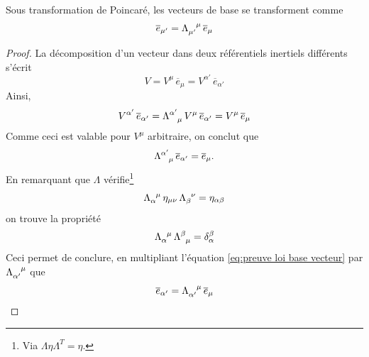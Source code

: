{\begin{notat}
\end{notat}
\begin{theoremframe}
    \begin{propri}
        Sous transformation de Poincaré, les vecteurs de base se transforment comme
        \begin{equation}
            \overline{e}_{\mu'} = \Lambda\indices{_{\mu'}^{\mu}}\, \overline{e}_{\mu}
        \end{equation}
    \end{propri}
\end{theoremframe}
\begin{proof}
    La décomposition d'un vecteur dans deux référentiels inertiels différents s'écrit
    \begin{equation}
        V = V^{\mu} \, \overline{e}_{\mu} = V^{\alpha'} \,\overline{e}_{\alpha'}
    \end{equation}
    Ainsi,
    \begin{equation}
        V^{\alpha'}\, \overline{e}_{\alpha'} = \Lambda\indices{^{\alpha'}_{\mu}} \, V^\mu \,\overline{e}_{\alpha'} = V^\mu \,\overline{e}_{\mu}
    \end{equation}
    Comme ceci est valable pour $V^\mu$ arbitraire, on conclut que 
    \begin{equation}
        \label{eq:preuve loi base vecteur}
        \Lambda\indices{^{\alpha'}_{\mu}} \,\overline{e}_{\alpha'} = \overline{e}_{\mu}.
    \end{equation}
    En remarquant que $\Lambda$ vérifie\footnote{Via $\Lambda \eta \Lambda^T = \eta$.}
    \begin{equation}
        \Lambda\indices{_{\alpha}^\mu}\, \eta_{\mu\nu} \,\Lambda\indices{_{\beta}^\nu} = \eta_{\alpha\beta}
    \end{equation}
    on trouve la propriété
    \begin{equation}
        \label{eq:id lambda}
        \Lambda\indices{_{\alpha}^\mu} \, \Lambda\indices{^\beta_\mu} = \delta^\beta_{\alpha}
    \end{equation}
    Ceci permet de conclure, en multipliant l'équation \ref{eq:preuve loi base vecteur} par $\Lambda\indices{_{\alpha'}^{\mu}}$ que
    \begin{equation}
        \overline{e}_{\alpha'} = \Lambda\indices{_{\alpha'}^{\mu}}\, \overline{e}_{\mu}
    \end{equation}
\end{proof}

}
